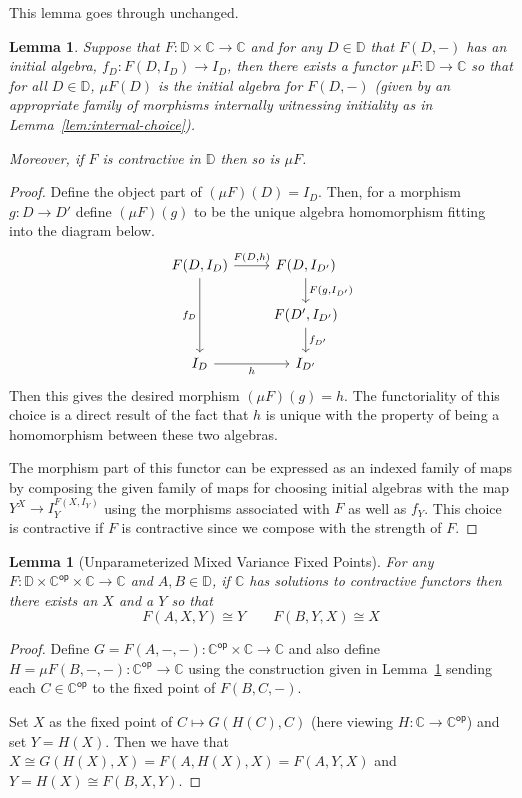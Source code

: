 \documentclass{amsart}
\newtheorem{lem}[thm]{Lemma}
\newcommand{\Ccat}{\ensuremath{\mathbb{C}}}
\newcommand{\Dcat}{\ensuremath{\mathbb{D}}}
\newcommand{\op}[1]{\ensuremath{#1^{\mathsf{op}}}}
\begin{document}
This lemma goes through unchanged.
\begin{lem}\label{lem:mu-construction}
  Suppose that $F : \Dcat \times \Ccat \to \Ccat$ and for any
  $D \in \Dcat$ that $F(D, -)$ has an initial algebra,
  $f_D : F(D, I_D) \to I_D$, then there exists a functor
  $\mu F : \Dcat \to \Ccat$ so that for all $D \in \Dcat$, $\mu F(D)$
  is the initial algebra for $F(D, -)$ (given by an appropriate family
  of morphisms internally witnessing initiality as in
  Lemma~\ref{lem:internal-choice}).

  Moreover, if $F$ is contractive in $\Dcat$ then so is $\mu F$.
\end{lem}
\begin{proof}
  Define the object part of $(\mu F)(D) = I_D$. Then, for a morphism
  $g : D \to D'$ define $(\mu F)(g)$ to be the unique algebra
  homomorphism fitting into the diagram below.
  \[
    \begin{tikzcd}
      F(D, I_D) \ar[dd, swap, "f_D"] \ar[r, "{F(D, h)}"] & F(D, I_{D'}) \ar[d, "{F(g, I_{D'})}"]\\
      & F(D', I_{D'}) \ar[d, "f_{D'}"]\\
      I_D \ar[r, swap, "h"] & I_{D'}
    \end{tikzcd}
  \]
  Then this gives the desired morphism $(\mu F)(g) = h$. The
  functoriality of this choice is a direct result of the fact that $h$
  is unique with the property of being a homomorphism between these
  two algebras.

  The morphism part of this functor can be expressed as an indexed
  family of maps by composing the given family of maps for choosing
  initial algebras with the map $Y^X \to I_Y^{F(X, I_Y)}$ using the
  morphisms associated with $F$ as well as $f_Y$. This choice is
  contractive if $F$ is contractive since we compose with the strength
  of $F$.
\end{proof}

\begin{lem}[Unparameterized Mixed Variance Fixed Points]\label{lem:unparameterized}
  For any $F : \Dcat \times \op{\Ccat} \times \Ccat \to \Ccat$ and
  $A, B \in \Dcat$, if $\Ccat$ has solutions to contractive functors
  then there exists an $X$ and a $Y$ so that
  \[
    F(A, X, Y) \cong Y \qquad F(B, Y, X) \cong X
  \]
\end{lem}
\begin{proof}
  Define $G = F(A, -, -) : \op{\Ccat} \times \Ccat \to \Ccat$ and also
  define $H = \mu F(B, -, -) : \op{\Ccat} \to \Ccat$ using the
  construction given in Lemma~\ref{lem:mu-construction} sending each
  $C \in \op{\Ccat}$ to the fixed point of $F(B, C, -)$.

  Set $X$ as the fixed point of $C \mapsto G(H(C), C)$ (here viewing
  $H : \Ccat \to \op{\Ccat}$) and set $Y = H(X)$. Then we have that
  $X \cong G(H(X), X) = F(A, H(X), X) = F(A, Y, X)$ and
  $Y = H(X) \cong F(B, X, Y)$.
\end{proof}
\end{document}
